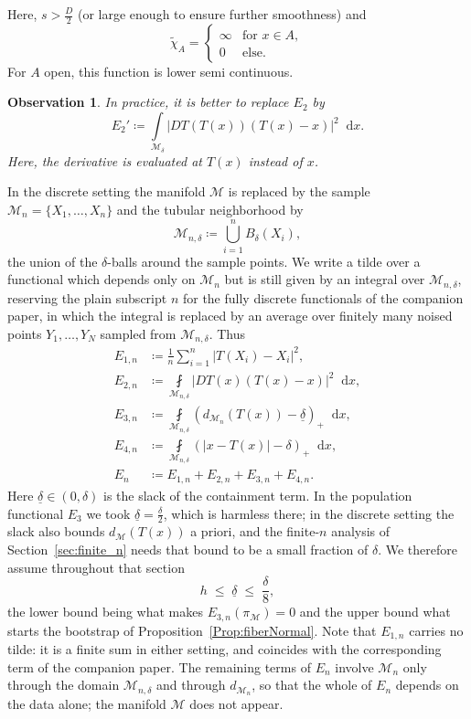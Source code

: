 \documentclass[11pt]{amsart}%
\newcommand*{\dd}{\mathop{}\!\mathrm{d}}
\theoremstyle{plain}
\newtheorem*{observation*}{Observation}
\newcommand{\1}{\mathbf{1}}
\newcommand{\M}{\mathcal{M}}
\begin{document}
Here, $s>\frac{D}{2}$ (or large enough to ensure further smoothness) and
$$\widetilde \chi_A=\begin{cases}
    \infty &\text{for }x\in A,\\
    0&\text{else.}
\end{cases}$$
For $A$ open, this function is lower semi continuous.

\begin{observation*}
    In practice, it is better to replace $E_2$ by 
    $$E_2'\coloneqq \int\limits_{\M_\delta} |DT(T(x))(T(x)-x)|^2 \dd x.$$
    Here, the derivative is evaluated at $T(x)$ instead of $x$.
\end{observation*}


In the discrete setting the manifold $\M$ is replaced by the sample
$\M_n=\{X_1,\dots,X_n\}$ and the tubular neighborhood by
\[
  \M_{n,\delta}\coloneqq\bigcup_{i=1}^n B_\delta(X_i),
\]
the union of the $\delta$-balls around the sample points. We write a tilde over a functional which
depends only on $\M_n$ but is still given by an integral over $\M_{n,\delta}$, reserving the plain
subscript $n$ for the fully discrete functionals of the companion paper, in which the integral is
replaced by an average over finitely many noised points $Y_1,\dots,Y_N$ sampled from
$\M_{n,\delta}$. Thus
\begin{align*}
    E_{1,n}&\coloneqq\frac{1}{n}\sum\limits_{i=1}^n |T(X_i)-X_i|^2,\\
    E_{2,n}&\coloneqq \fint\limits_{\M_{n,\delta}} |DT(x)(T(x)-x)|^2 \dd x,\\
    E_{3,n}&\coloneqq \fint\limits_{\M_{n,\delta}} \left(d_{\M_n}(T(x))-\underline\delta\right)_+\dd x,\\
    E_{4,n}&\coloneqq \fint\limits_{\M_{n,\delta}} \left(|x-T(x)|-\delta\right)_+\dd x,\\
    E_n&\coloneqq E_{1,n}+E_{2,n}+E_{3,n}+E_{4,n}.
\end{align*}
Here $\underline\delta\in(0,\delta)$ is the slack of the containment term. In the population
functional $E_3$ we took $\underline\delta=\frac{\delta}{2}$, which is harmless there; in the discrete
setting the slack also bounds $d_\M(T(x))$ a priori, and the finite-$n$ analysis of
Section~\ref{sec:finite_n} needs that bound to be a small fraction of $\delta$. We therefore assume
throughout that section
\begin{equation}\label{eqn:slackhyp}
    h\;\le\;\underline\delta\;\le\;\frac{\delta}{8},
\end{equation}
the lower bound being what makes $E_{3,n}(\pi_\M)=0$ and the upper bound what starts the
bootstrap of Proposition~\ref{Prop:fiberNormal}.
Note that $E_{1,n}$ carries no tilde: it is a finite sum in either setting, and coincides with the
corresponding term of the companion paper. The remaining terms of $E_n$ involve $\M_n$ only through the domain $\M_{n,\delta}$ and through
$d_{\M_n}$, so that the whole of $E_n$ depends on the data alone;
the manifold $\M$ does not appear.
\end{document}
